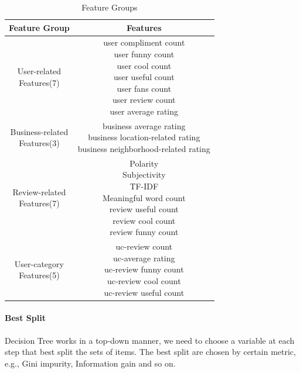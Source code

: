 \documentclass{vgtc}                          %
\begin{document}
\begin{table}
\centering
\caption{Feature Groups}
\label{tb:feature}
\begin{tabular}{|c|c|}
\hline
Feature Group & Features \\ \hline
\tabincell{c}{User-related \\Features(7)} & \tabincell{c}{user compliment count\\user funny count\\user cool count\\user useful count\\user fans count \\ user review count \\ user average rating} \\ \hline
\tabincell{c}{Business-related \\Features(3)} & \tabincell{c}{business average rating\\business location-related rating\\business neighborhood-related rating} \\ \hline
\tabincell{c}{Review-related \\Features(7)} & \tabincell{c}{Polarity \\  Subjectivity  \\  TF-IDF  \\ Meaningful word count  \\ review useful count\\ review cool count \\ review funny count  } \\  \hline
\tabincell{c}{User-category \\Features(5)} & \tabincell{c}{  uc-review count   \\  uc-average rating  \\ uc-review funny count \\  uc-review  cool count   \\  uc-review useful count }\\
\hline
\end{tabular}
\end{table}


\paragraph{Best Split}
Decision Tree works in a top-down manner, we need to choose a variable at each step that best split the sets of items. The best split are chosen by certain metric, e.g., Gini impurity, Information gain and so on. 
\end{document}
